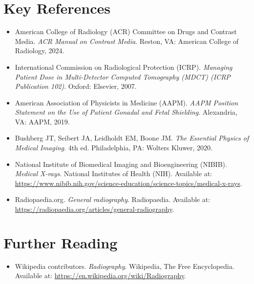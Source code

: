 \section{Key References}
\begin{itemize}
  \item American College of Radiology (ACR) Committee on Drugs and Contrast Media. \textit{ACR Manual on Contrast Media}. Reston, VA: American College of Radiology, 2024.
  \item International Commission on Radiological Protection (ICRP). \textit{Managing Patient Dose in Multi-Detector Computed Tomography (MDCT) (ICRP Publication 102)}. Oxford: Elsevier, 2007.
  \item American Association of Physicists in Medicine (AAPM). \textit{AAPM Position Statement on the Use of Patient Gonadal and Fetal Shielding}. Alexandria, VA: AAPM, 2019.
  \item Bushberg JT, Seibert JA, Leidholdt EM, Boone JM. \textit{The Essential Physics of Medical Imaging}. 4th ed. Philadelphia, PA: Wolters Kluwer, 2020.
  \item National Institute of Biomedical Imaging and Bioengineering (NIBIB). \textit{Medical X-rays}. National Institutes of Health (NIH). Available at: \url{https://www.nibib.nih.gov/science-education/science-topics/medical-x-rays}.
  \item Radiopaedia.org. \textit{General radiography}. Radiopaedia. Available at: \url{https://radiopaedia.org/articles/general-radiography}.
\end{itemize}

\section{Further Reading}
\begin{itemize}
  \item Wikipedia contributors. \textit{Radiography}. Wikipedia, The Free Encyclopedia. Available at: \url{https://en.wikipedia.org/wiki/Radiography}.
\end{itemize}

